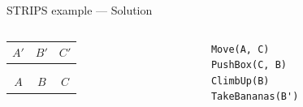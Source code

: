 \begin{frame}[fragile]{STRIPS example --- Solution}
	\begin{columns}
		\begin{column}{0.4\textwidth}
			\begin{tabular}{c|c|c}
				  $A'$  &   $B'$  &   $C'$  \\\hline
				\emptyy & \banana\monkey & \emptyy \\
				\emptyy & \boxbox & \emptyy \\\hline
				  $A$   &   $B$   &    $C$
			\end{tabular}
		\end{column}
		\begin{column}{0.58\textwidth}
			\begin{lstlisting}
Move(A, C)
PushBox(C, B)
ClimbUp(B)
TakeBananas(B')
			\end{lstlisting}
		\end{column}
	\end{columns}
\end{frame}

